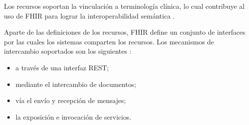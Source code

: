 Los recursos soportan la vinculación a terminología clínica, lo cual contribuye al uso de FHIR para lograr la interoperabilidad semántica \cite{FHIRArchitecture}.

Aparte de las definiciones de los recursos, FHIR define un conjunto de interfaces por las cuales los sistemas comparten los recursos. Los mecanismos de intercambio soportados son los siguientes \cite{FHIRClinician}:
\begin{itemize}
  \item a través de una interfaz REST;
  \item mediante el intercambio de documentos;
  \item vía el envío y recepción de mensajes;
  \item la exposición e invocación de servicios.
\end{itemize}
